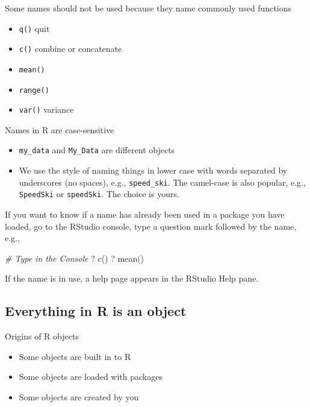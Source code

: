 \documentclass[
]{book}
\newenvironment{Shaded}{\begin{snugshade}}{\end{snugshade}}
\newcommand{\AttributeTok}[1]{\textcolor[rgb]{0.77,0.63,0.00}{#1}}
\newcommand{\CommentTok}[1]{\textcolor[rgb]{0.56,0.35,0.01}{\textit{#1}}}
\newcommand{\StringTok}[1]{\textcolor[rgb]{0.31,0.60,0.02}{#1}}
\providecommand{\tightlist}{%
  \setlength{\itemsep}{0pt}\setlength{\parskip}{0pt}}
\begin{document}
Some names should not be used because they name commonly used functions

\begin{itemize}
\tightlist
\item
  \texttt{q()} quit
\item
  \texttt{c()} combine or concatenate
\item
  \texttt{mean()}
\item
  \texttt{range()}
\item
  \texttt{var()} variance
\end{itemize}

Names in R are case-sensitive

\begin{itemize}
\tightlist
\item
  \texttt{my\_data} and \texttt{My\_Data} are different objects
\item
  We use the style of naming things in lower case with words separated by underscores (no spaces), e.g., \texttt{speed\_ski}. The camel-case is also popular, e.g., \texttt{SpeedSki} or \texttt{speedSki}. The choice is yours.
\end{itemize}

If you want to know if a name has already been used in a package you have loaded, go to the RStudio console, type a question mark followed by the name, e.g.,

\begin{Shaded}
\begin{Highlighting}[]
\CommentTok{\# Type in the Console}
\StringTok{\textasciigrave{}}\AttributeTok{? c()}\StringTok{\textasciigrave{}} 
\StringTok{\textasciigrave{}}\AttributeTok{? mean()}\StringTok{\textasciigrave{}}
\end{Highlighting}
\end{Shaded}

If the name is in use, a help page appears in the RStudio Help pane.

\hypertarget{everything-in-r-is-an-object}{%
\subsection{Everything in R is an object}\label{everything-in-r-is-an-object}}

Origins of R objects

\begin{itemize}
\tightlist
\item
  Some objects are built in to R
\item
  Some objects are loaded with packages
\item
  Some objects are created by you
\end{itemize}
\end{document}
